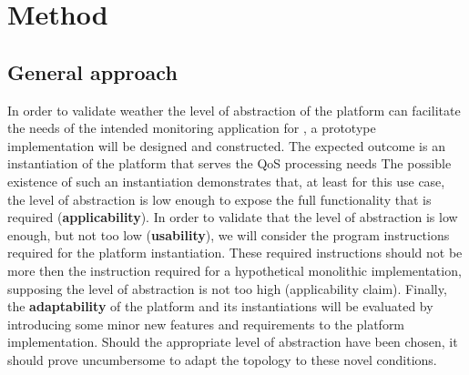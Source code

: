 
	
\section{Method}
\label{sec:val:method}
\subsection{General approach} 
In order to validate weather the level of abstraction of the platform can facilitate the needs of the intended monitoring application for \sensit, a prototype implementation will be designed and constructed. The expected outcome is an instantiation of the platform that serves the QoS processing needs The possible existence of such an instantiation demonstrates that, at least for this use case, the level of abstraction is low enough to expose the full functionality that is required  (\textbf{applicability}). In order to validate that the level of abstraction is low enough, but not too low (\textbf{usability}), we will consider the program instructions required for the platform instantiation. These required instructions should not be more then the instruction required for a hypothetical monolithic implementation, supposing the level of abstraction is not too high (applicability claim). Finally, the \textbf{adaptability} of the platform and its instantiations will be evaluated by introducing some minor new features and requirements to the platform implementation. Should the appropriate level of abstraction have been chosen, it should prove uncumbersome to adapt the topology to these novel conditions.

